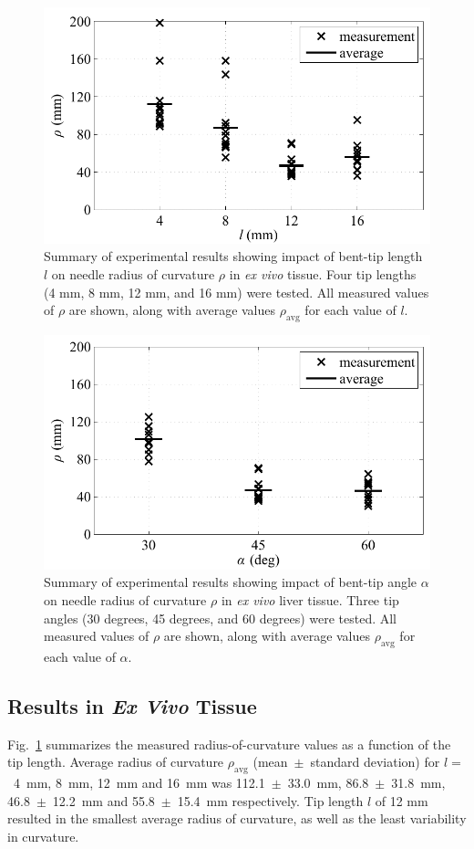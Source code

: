 \begin{figure}[!t]
\centering
\includegraphics[width=0.6\columnwidth]{Images/Chapter3/CurvatureVsLength/CurvatureVsLength}%
\caption[Impact of bent-tip length on needle radius of curvature]{Summary of experimental results showing impact of bent-tip length $l$ on needle radius of curvature $\rho$ in \textit{ex vivo} tissue. Four tip lengths (4 mm, 8 mm, 12 mm, and 16 mm) were tested. All measured values of $\rho$ are shown, along with average values $\rho_{\text{avg}}$ for each value of $l$.}
\label{fig:CurvatureVsLength}
\end{figure}

\begin{figure}[!t]
\centering
\includegraphics[width=0.6\columnwidth]{Images/Chapter3/CurvatureVsAngle/CurvatureVsAngle}%
\caption[Impact of bent-tip angle on needle radius of curvature]{Summary of experimental results showing impact of bent-tip angle $\alpha$ on needle radius of curvature $\rho$ in \textit{ex vivo} liver tissue. Three tip angles (30 degrees, 45 degrees, and 60 degrees) were tested. All measured values of $\rho$ are shown, along with average values $\rho_{\text{avg}}$ for each value of $\alpha$.}
\label{fig:CurvatureVsAngle}
\end{figure} 

\subsection{Results in \textit{Ex Vivo} Tissue}
Fig.~\ref{fig:CurvatureVsLength} summarizes the measured radius-of-curvature values as a function of the tip length. Average radius of curvature $\rho_{\text{avg}}$ (mean~$\pm$~standard deviation) for $l =$~4~mm, 8~mm, 12~mm and 16~mm was 112.1~$\pm$~33.0~mm, 86.8~$\pm$~31.8~mm, 46.8~$\pm$~12.2~mm and 55.8~$\pm$~15.4~mm respectively. Tip length $l$ of 12 mm resulted in the smallest average radius of curvature, as well as the least variability in curvature. 

